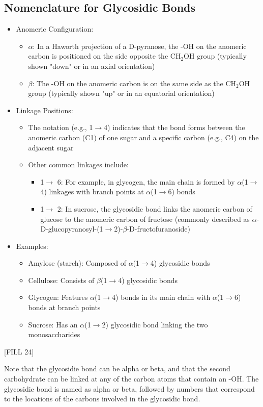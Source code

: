 \documentclass[10pt]{article}
\begin{document}
\subsection*{Nomenclature for Glycosidic Bonds}
\begin{itemize}
    \item Anomeric Configuration:
    \begin{itemize}
        \item $\alpha$: In a Haworth projection of a D-pyranose, the -OH on the anomeric carbon is positioned on the side opposite the CH$_2$OH group (typically shown "down" or in an axial orientation)
        \item $\beta$: The -OH on the anomeric carbon is on the same side as the CH$_2$OH group (typically shown "up" or in an equatorial orientation)
    \end{itemize}
    \item Linkage Positions:
    \begin{itemize}
        \item The notation (e.g., 1$\rightarrow$4) indicates that the bond forms between the anomeric carbon (C1) of one sugar and a specific carbon (e.g., C4) on the adjacent sugar
        \item Other common linkages include:
        \begin{itemize}
            \item 1$ \rightarrow$ 6: For example, in glycogen, the main chain is formed by $\alpha$(1$\rightarrow$4) linkages with branch points at $\alpha$(1$\rightarrow$6) bonds
            \item 1$\rightarrow$ 2: In sucrose, the glycosidic bond links the anomeric carbon of glucose to the anomeric carbon of fructose (commonly described as $\alpha$-D-glucopyranosyl-(1$\rightarrow$2)-$\beta$-D-fructofuranoside)
        \end{itemize}
    \end{itemize}
    \item Examples:
    \begin{itemize}
        \item Amylose (starch): Composed of $\alpha$(1$\rightarrow$4) glycosidic bonds
        \item Cellulose: Consists of $\beta$(1$\rightarrow$4) glycosidic bonds
        \item Glycogen: Features $\alpha$(1$\rightarrow$4) bonds in its main chain with $\alpha$(1$\rightarrow$6) bonds at branch points
        \item Sucrose: Has an $\alpha$(1$\rightarrow$2) glycosidic bond linking the two monosaccharides
    \end{itemize}
\end{itemize}
\begin{center}
    [FILL 24]
\end{center}
Note that the glycosidie bond can be alpha or beta, and that the second carbohydrate can be linked at any of the carbon atoms that contain an -OH.  The glycosidic bond is named as alpha or beta, followed by numbers that correspond to the locations of the carbons involved in the glycosidic bond.
\end{document}
